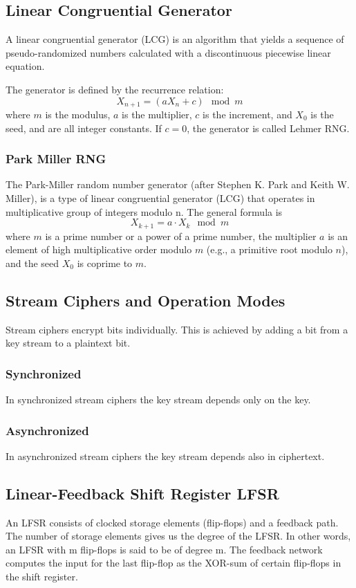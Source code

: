 \documentclass{article}
\theoremstyle{mytheoremstyle}
\begin{document}
    \subsection{Linear Congruential Generator}
    A linear congruential generator (LCG) is an algorithm that yields a sequence of pseudo-randomized numbers calculated with a discontinuous piecewise linear equation. 

    The generator is defined by the recurrence relation:
    \begin{equation*}
        X_{n+1}=(aX_n+c)\mod m
    \end{equation*}
    where $m$ is the modulus, $a$ is the multiplier, $c$ is the increment, and $X_0$ is the seed, and are all integer constants. If $c=0$, the generator is called Lehmer RNG.
    \subsubsection{Park Miller RNG}
    The Park-Miller random number generator (after Stephen K. Park and Keith W. Miller), is a type of linear congruential generator (LCG) that operates in multiplicative group of integers modulo n. The general formula is 
    \begin{equation*}
        X_{k+1}=a\cdot X_k \mod m
    \end{equation*}
    where $m$ is a prime number or a power of a prime number, the multiplier $a$ is an element of high multiplicative order modulo $m$ (e.g., a primitive root modulo $n$), and the seed $X_0$ is coprime to $m$. 
    \subsection{Stream Ciphers and Operation Modes}
    Stream ciphers encrypt bits individually. This is achieved by adding a bit from a key stream to a plaintext bit. 
    \subsubsection{Synchronized}
    In synchronized stream ciphers the key stream depends only on the key.
    \subsubsection{Asynchronized}
    In asynchronized stream ciphers the key stream depends also in ciphertext.
    \subsection{Linear-Feedback Shift Register LFSR}
    An LFSR consists of clocked storage elements (flip-flops) and a feedback path. The number of storage elements gives us the degree of the LFSR. In other words, an LFSR with m flip-flops is said to be of degree m. The feedback network computes the input for the last flip-flop as the XOR-sum of certain flip-flops in the shift register.
\end{document}
